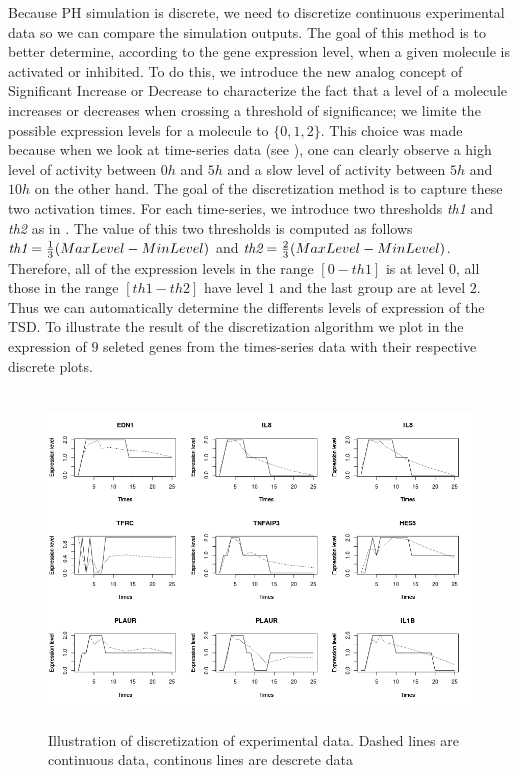 Because PH simulation is discrete, we need to discretize continuous experimental data so we can compare the simulation outputs.
The goal of this method is to better determine, according to the gene expression level, when  a given molecule is activated or inhibited.
To do this, we introduce the new analog concept of Significant Increase or Decrease to characterize the fact that a level of a molecule 
increases or decreases when crossing a threshold of significance; we limite the possible expression levels for a molecule to
$\{0, 1, 2\}$. This choice was made because when we look at time-series data (see ), one can clearly observe a high level of
activity between $0h$ and $5h$ and a slow level of activity between $5h$ and $10h$ on the other hand. The goal of the discretization method is to capture these
two activation times. For each time-series, we introduce two thresholds \emph{th1} and \emph{th2} as in . The value of this two
thresholds is computed as follows $\emph{th1}=\frac{1}{3}(MaxLevel-MinLevel)$ and $\emph{th2}=\frac{2}{3}(MaxLevel-MinLevel)$. Therefore, all
of the expression levels in the range $[0-th1]$ is at level $0$, all those in the range $[th1-th2]$  have level $1$ and the last group are at
level $2$. Thus we can automatically determine the differents levels of expression of the TSD. 
To illustrate the result of the discretization algorithm we plot in  the expression 
of $9$ seleted genes from the times-series data with their respective discrete plots. 

\begin{figure}[!t]
 \centering
 \includegraphics[width=6.5in,height=3.5in]{images/ResultDiscretization.png}
 \caption{Illustration of discretization of experimental data. Dashed lines are continuous data, continous lines are descrete data}
 \label{fig:illustrationDiscretisation}
\end{figure}

